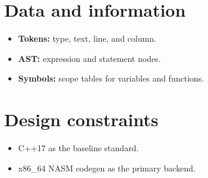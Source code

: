\documentclass[11pt,a4paper]{article}
\begin{document}
\section{Data and information}
\begin{itemize}
    \item \textbf{Tokens:} type, text, line, and column.
    \item \textbf{AST:} expression and statement nodes.
    \item \textbf{Symbols:} scope tables for variables and functions.
\end{itemize}

\section{Design constraints}
\begin{itemize}
    \item C++17 as the baseline standard.
    \item x86\_64 NASM codegen as the primary backend.
\end{itemize}
\end{document}
